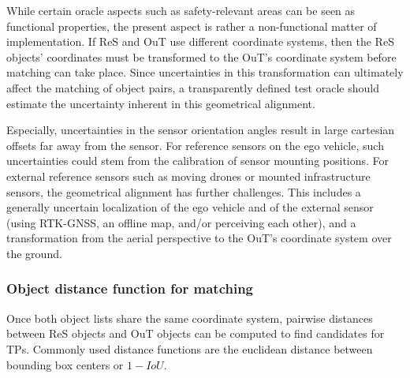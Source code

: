 \documentclass[conference]{IEEEtran}
\begin{document}
While certain oracle aspects such as safety-relevant areas can be seen as functional properties, the present aspect is rather a non-functional matter of implementation.
If ReS and OuT use different coordinate systems, then the ReS objects' coordinates must be transformed to the OuT's coordinate system before matching can take place.
Since uncertainties in this transformation can ultimately affect the matching of object pairs, a transparently defined test oracle should estimate the uncertainty inherent in this geometrical alignment. 


 
Especially, uncertainties in the sensor orientation angles result in large cartesian offsets far away from the sensor.
For reference sensors on the ego vehicle, such uncertainties could stem from the calibration of sensor mounting positions. 
For external reference sensors such as moving drones or mounted infrastructure sensors, the geometrical alignment has further challenges. %
This includes a generally uncertain localization of the ego vehicle and of the external sensor (using RTK-GNSS, an offline map, and/or perceiving each other), and a transformation from the aerial perspective to the OuT's coordinate system over the ground. 



\subsubsection{Object distance function for matching}
\label{sec:basic_dist_func}

Once both object lists share the same coordinate system, pairwise distances between ReS objects and OuT objects can be computed to find candidates for TPs. 
Commonly used distance functions are the euclidean distance between bounding box centers or $1 - IoU$. %

\end{document}
